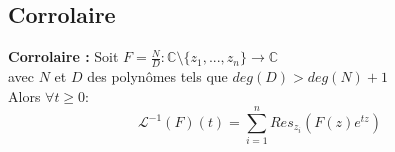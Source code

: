 \subsection{Corrolaire}
\textbf{Corrolaire :} Soit $F = \frac{N}{D} : \mathbb{C} \setminus \{z_1,...,z_n\} \to \mathbb{C}$ \\
avec $N$ et $D$ des polynômes tels que $deg(D) > deg(N) + 1$ \\
Alors $\forall t \geq 0 :$
$$\mathcal{L}^{-1}(F)(t) = \sum_{i=1}^n Res_{z_i}(F(z)e^{tz})$$
